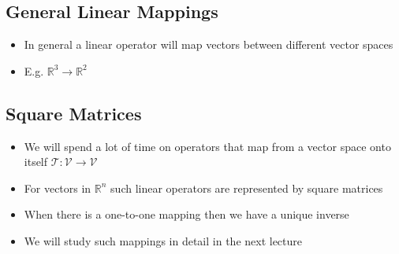 
\begin{slide}
\section[-2]{General Linear Mappings}

\pb\pause{}
\begin{itemize}
\item In general a linear operator will map vectors between different
  vector spaces\pauseh
\item E.g. $\mathbb{R}^3 \rightarrow \mathbb{R}^2$\pauseh{}
  \begin{center}
    \pause
  \end{center}
\end{itemize}


\end{slide}


\begin{slide}
\section{Square Matrices}

\begin{PauseHighLight}
  \begin{itemize}
  \item We will spend a lot of time on operators that map from a vector
    space onto itself $\mathcal{T}: \mathcal{V}\rightarrow\mathcal{V}$\pause
  \item For vectors in $\mathbb{R}^n$ such linear operators are
    represented by square matrices\pause
  \item When there is a one-to-one mapping then we have a unique inverse\pause
  \item We will study such mappings in detail in the next lecture\pause
  \end{itemize}
\end{PauseHighLight}

\end{slide}


